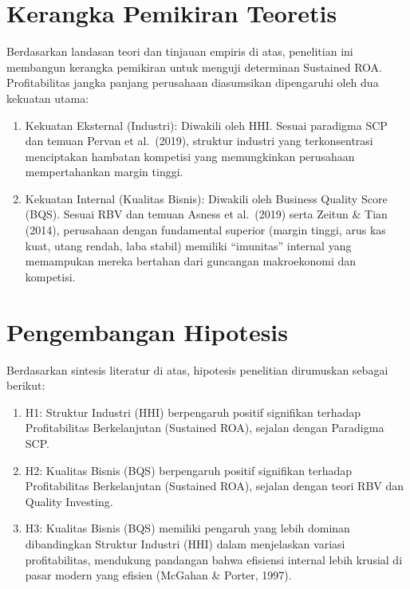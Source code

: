 \documentclass[12pt,a4paper]{report}
\providecommand{\tightlist}{%
  \setlength{\itemsep}{0pt}\setlength{\parskip}{0pt}%
}
\begin{document}
\hypertarget{kerangka-pemikiran-teoretis}{%
\section{Kerangka Pemikiran
Teoretis}\label{kerangka-pemikiran-teoretis}}

Berdasarkan landasan teori dan tinjauan empiris di atas, penelitian ini
membangun kerangka pemikiran untuk menguji determinan Sustained ROA.
Profitabilitas jangka panjang perusahaan diasumsikan dipengaruhi oleh
dua kekuatan utama:

\begin{enumerate}
\def\labelenumi{\arabic{enumi}.}
\tightlist
\item
  Kekuatan Eksternal (Industri): Diwakili oleh HHI. Sesuai paradigma SCP
  dan temuan Pervan et al.~(2019), struktur industri yang terkonsentrasi
  menciptakan hambatan kompetisi yang memungkinkan perusahaan
  mempertahankan margin tinggi.
\item
  Kekuatan Internal (Kualitas Bisnis): Diwakili oleh Business Quality
  Score (BQS). Sesuai RBV dan temuan Asness et al.~(2019) serta Zeitun
  \& Tian (2014), perusahaan dengan fundamental superior (margin tinggi,
  arus kas kuat, utang rendah, laba stabil) memiliki ``imunitas''
  internal yang memampukan mereka bertahan dari guncangan makroekonomi
  dan kompetisi.
\end{enumerate}

\hypertarget{pengembangan-hipotesis}{%
\section{Pengembangan Hipotesis}\label{pengembangan-hipotesis}}

Berdasarkan sintesis literatur di atas, hipotesis penelitian dirumuskan
sebagai berikut:

\begin{enumerate}
\def\labelenumi{\arabic{enumi}.}
\tightlist
\item
  H1: Struktur Industri (HHI) berpengaruh positif signifikan terhadap
  Profitabilitas Berkelanjutan (Sustained ROA), sejalan dengan Paradigma
  SCP.
\item
  H2: Kualitas Bisnis (BQS) berpengaruh positif signifikan terhadap
  Profitabilitas Berkelanjutan (Sustained ROA), sejalan dengan teori RBV
  dan Quality Investing.
\item
  H3: Kualitas Bisnis (BQS) memiliki pengaruh yang lebih dominan
  dibandingkan Struktur Industri (HHI) dalam menjelaskan variasi
  profitabilitas, mendukung pandangan bahwa efisiensi internal lebih
  krusial di pasar modern yang efisien (McGahan \& Porter, 1997).
\end{enumerate}
\end{document}
